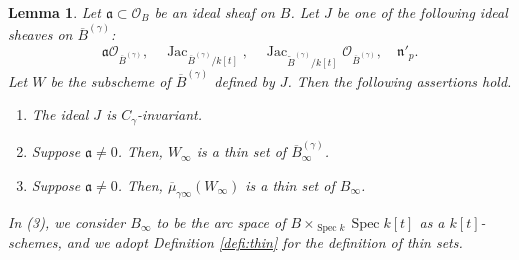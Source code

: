 \documentclass[a4paper,11pt]{amsart}
\newtheorem{lem}[thm]{Lemma}
\theoremstyle{definition}
\theoremstyle{remark}
\begin{document}
\begin{lem}\label{lem:thin}
Let $\mathfrak{a} \subset \mathcal{O}_B$ be an ideal sheaf on $B$. 
Let $J$ be one of the following ideal sheaves on $\overline{B}^{(\gamma)}$: 
\[
\mathfrak{a} \mathcal{O}_{\overline{B}^{(\gamma)}}, \quad
\operatorname{Jac}_{\overline{B}^{(\gamma)}/k[t]}, \quad 
\operatorname{Jac}_{\widetilde{B}^{(\gamma)}/k[t]} \mathcal{O}_{\overline{B}^{(\gamma)}}, \quad 
\mathfrak{n}'_{p}.
\]
Let $W$ be the subscheme of $\overline{B}^{(\gamma)}$ defined by $J$. 
Then the following assertions hold. 

\begin{enumerate}
\item 
The ideal $J$ is $C_{\gamma}$-invariant. 

\item 
Suppose $\mathfrak{a} \not = 0$. 
Then, $W_{\infty}$ is a thin set of $\overline{B}^{(\gamma)} _{\infty}$.

\item
Suppose $\mathfrak{a} \not = 0$. 
Then, $\overline{\mu}_{\gamma \infty} (W_{\infty})$ is a thin set of $B_{\infty}$.
\end{enumerate}
In (3), we consider $B_{\infty}$ to be the arc space of $B \times _{\operatorname{Spec} k} \operatorname{Spec} k[t]$ as a $k[t]$-schemes, 
and we adopt Definition \ref{defi:thin} for the definition of thin sets.
\end{lem}
\end{document}
